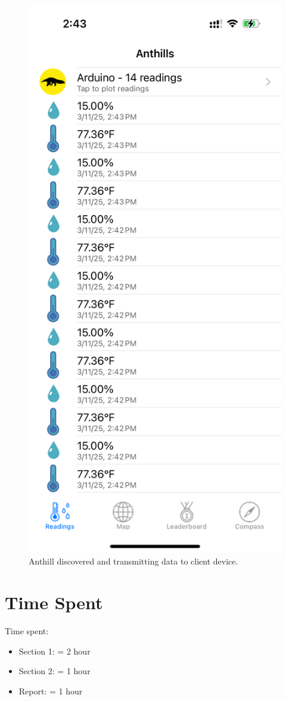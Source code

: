\documentclass{lab}
\begin{document}
\begin{figure}[h]
    \begin{center}
    \includegraphics[height=0.35\textheight]{images/anthill.png} 
    \caption{Anthill discovered and transmitting data to client device.}
    \end{center}
\end{figure}


\section{Time Spent} 

Time spent:

\begin{itemize}
  \item Section 1: = 2 hour
  \item Section 2: = 1 hour
  \item Report: = 1 hour
\end{itemize}
\end{document}
